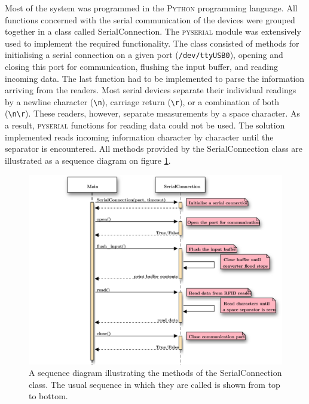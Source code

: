 Most of the system was programmed in the \textsc{Python} programming language. All functions concerned with the serial communication of the devices were grouped together in a class called \textsf{SerialConnection}. The \textsc{pyserial} module was extensively used to implement the required functionality. The class consisted of methods for initialising a serial connection on a given port (\verb!/dev/ttyUSB0!), opening and closing this port for communication, flushing the input buffer, and reading incoming data. The last function had to be implemented to parse the information arriving from the readers. Most serial devices separate their individual readings by a newline character (\verb!\n!), carriage return (\verb!\r!), or a combination of both (\verb!\n\r!). These readers, however, separate measurements by a space character. As a result, \textsc{pyserial} functions for reading data could not be used. The solution implemented reads incoming information character by character until the separator is encountered. All methods provided by the \textsf{SerialConnection} class are illustrated as a sequence diagram on figure \ref{fig:seqserial}.

\begin{figure}[h]
	\begin{center}
		\includegraphics[width=1\textwidth]{figures/seqdiag/serial}
		\caption{A sequence diagram illustrating the methods of the \textsf{SerialConnection} class. The usual sequence in which they are called is shown from top to bottom.}
		\label{fig:seqserial}
	\end{center}
\end{figure}

